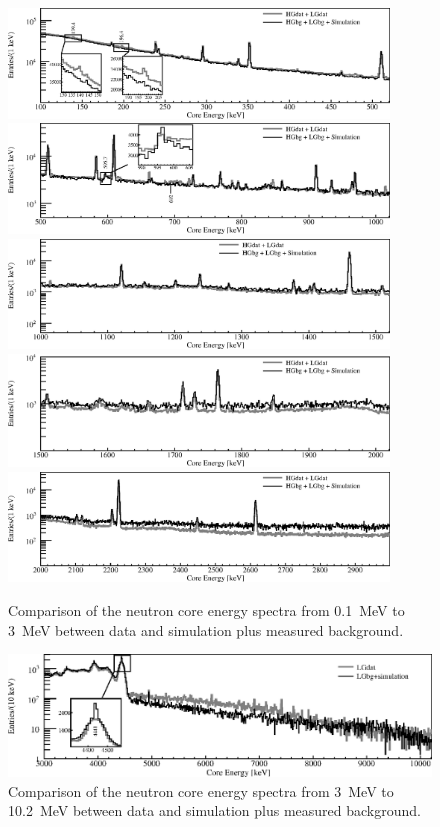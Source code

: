 \begin{figure}[tbhp]
  \centering
  \includegraphics[width=0.9\textwidth,clip]{spectra_0_520keVm}
  \includegraphics[width=0.9\textwidth,clip]{spectra_500_1020keVm}
  \includegraphics[width=0.9\textwidth,clip]{spectra_1000_1520keVm}
  \includegraphics[width=0.9\textwidth,clip]{spectra_1500_2020keVm}
  \includegraphics[width=0.9\textwidth,clip]{spectra_2_3MeVm}
  \caption{Comparison of the neutron core energy spectra from 0.1~MeV
    to 3~MeV between data and simulation plus measured background.}
  \label{fig:neu:mc}
\end{figure}

\begin{figure}[tbhp]
  \centering
  \includegraphics[width=\textwidth,clip]{spectra_3_11MeVm}
  \caption{Comparison of the neutron core energy spectra from 3~MeV to
    10.2~MeV between data and simulation plus measured background.}
  \label{fig:neu:mcl}
\end{figure}

